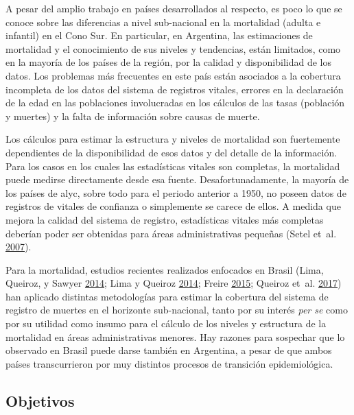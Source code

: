 \documentclass[12pt,spanish,]{article}
\begin{document}
A pesar del amplio trabajo en países desarrollados al respecto, es poco
lo que se conoce sobre las diferencias a nivel sub-nacional en la
mortalidad (adulta e infantil) en el Cono Sur. En particular, en
Argentina, las estimaciones de mortalidad y el conocimiento de sus
niveles y tendencias, están limitados, como en la mayoría de los países
de la región, por la calidad y disponibilidad de los datos. Los
problemas más frecuentes en este país están asociados a la cobertura
incompleta de los datos del sistema de registros vitales, errores en la
declaración de la edad en las poblaciones involucradas en los cálculos
de las tasas (población y muertes) y la falta de información sobre
causas de muerte.

Los cálculos para estimar la estructura y niveles de mortalidad son
fuertemente dependientes de la disponibilidad de esos datos y del
detalle de la información. Para los casos en los cuales las estadísticas
vitales son completas, la mortalidad puede medirse directamente desde
esa fuente. Desafortunadamente, la mayoría de los países de \gls{alyc},
sobre todo para el periodo anterior a 1950, no poseen datos de registros
de vitales de confianza o simplemente se carece de ellos. A medida que
mejora la calidad del sistema de registro, estadísticas vitales más
completas deberían poder ser obtenidas para áreas administrativas
pequeñas (Setel et~al. \protect\hyperlink{ref-SetelEtAl2007}{2007}).

Para la mortalidad, estudios recientes realizados enfocados en Brasil
(Lima, Queiroz, y Sawyer
\protect\hyperlink{ref-LimaQueirozSawyer2014}{2014}; Lima y Queiroz
\protect\hyperlink{ref-LimaQueiroz2014}{2014}; Freire
\protect\hyperlink{ref-FreireEtAl2015}{2015}; Queiroz et~al.
\protect\hyperlink{ref-QueirozFreireGonzagaEtAl2017}{2017}) han aplicado
distintas metodologías para estimar la cobertura del sistema de registro
de muertes en el horizonte sub-nacional, tanto por su interés \emph{per
se} como por su utilidad como insumo para el cálculo de los niveles y
estructura de la mortalidad en áreas administrativas menores. Hay
razones para sospechar que lo observado en Brasil puede darse también en
Argentina, a pesar de que ambos países transcurrieron por muy distintos
procesos de transición epidemiológica.

\hypertarget{sec:obj}{%
\subsection{Objetivos}\label{sec:obj}}
\end{document}
